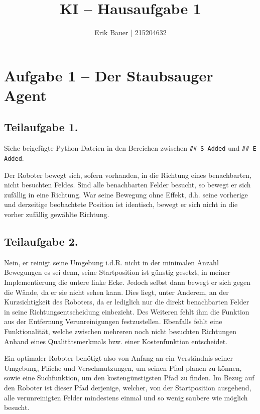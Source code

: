 \documentclass[
  a4paper,
  11pt,
]{scrartcl}
\title{KI -- Hausaufgabe 1}
\subtitle{Erik Bauer | 215204632}
\date{}
\begin{document}
\maketitle

\section*{Aufgabe 1 -- Der Staubsauger Agent}

\subsection*{Teilaufgabe 1.}

Siehe beigefügte Python-Dateien in den Bereichen zwischen \verb|## S Added| und \verb|## E Added|.

Der Roboter bewegt sich, sofern vorhanden, in die Richtung eines benachbarten, nicht besuchten Feldes.
Sind alle benachbarten Felder besucht, so bewegt er sich zufällig in eine Richtung.
War seine Bewegung ohne Effekt, d.h. seine vorherige und derzeitige beobachtete Position ist identisch, bewegt er sich nicht in die vorher zufällig gewählte Richtung.

\subsection*{Teilaufgabe 2.}

Nein, er reinigt seine Umgebung i.d.R. nicht in der minimalen Anzahl Bewegungen es sei denn, seine Startposition ist günstig gesetzt, in meiner Implementierung die untere linke Ecke. Jedoch selbst dann bewegt er sich gegen die Wände, da er sie nicht sehen kann. Dies liegt, unter Anderem, an der \glqq Kurzsichtigkeit\grqq{} des Roboters, da er lediglich nur die direkt benachbarten Felder in seine Richtungsentscheidung einbezieht. Des Weiteren fehlt ihm die Funktion aus der Entfernung Verunreinigungen festzustellen. Ebenfalls fehlt eine Funktionalität, welche zwischen mehreren noch nicht besuchten Richtungen Anhand eines Qualitätsmerkmals bzw. einer Kostenfunktion entscheidet.

Ein optimaler Roboter benötigt also von Anfang an ein Verständnis seiner Umgebung, Fläche und Verschmutzungen, um seinen Pfad planen zu können, sowie eine Suchfunktion, um den kostengünstigsten Pfad zu finden. Im Bezug auf den Roboter ist dieser Pfad derjenige, welcher, von der Startposition ausgehend, alle verunreinigten Felder mindestens einmal und so wenig saubere wie möglich besucht.
\end{document}
